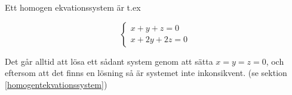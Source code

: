 \documentclass[../../main.tex]{subfiles}
\begin{document}
\begin{solution}{5}

Ett homogen ekvationssystem är t.ex

$$
\begin{cases}
x + y + z = 0\\
x + 2y +2 z = 0
\end{cases}
$$

Det går alltid att lösa ett sådant system genom att sätta $x = y = z = 0$, och eftersom att det finns en lösning så är systemet inte inkonsikvent. (se sektion \ref{homogentekvationssystem})

\end{solution}
\end{document}
